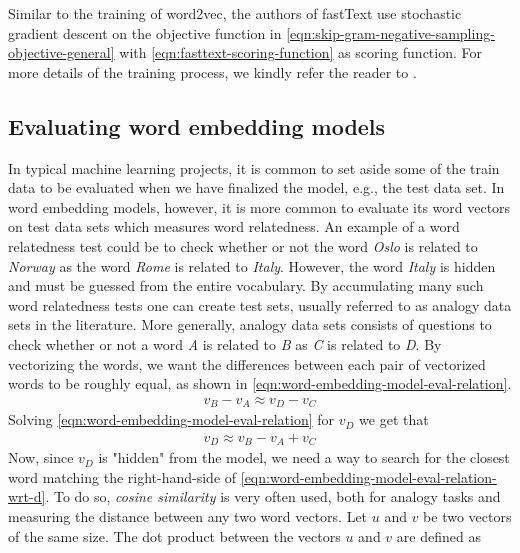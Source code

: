 Similar to the training of word2vec, the authors of fastText use stochastic gradient descent on the objective function in \cref{eqn:skip-gram-negative-sampling-objective-general} with \cref{eqn:fasttext-scoring-function} as scoring function. For more details of the training process, we kindly refer the reader to \cite[4 Experimental setup]{bojanowski2017enriching}.

\subsection{Evaluating word embedding models}
\label{sec:eval-word2vec-model}
In typical machine learning projects, it is common to set aside some of the train data to be evaluated when we have finalized the model, e.g., the test data set. In word embedding models, however, it is more common to evaluate its word vectors on test data sets which measures word relatedness. An example of a word relatedness test could be to check whether or not the word \textit{Oslo} is related to \textit{Norway} as the word \textit{Rome} is related to \textit{Italy}. However, the word \textit{Italy} is hidden and must be guessed from the entire vocabulary. By accumulating many such word relatedness tests one can create test sets, usually referred to as analogy data sets in the literature. More generally, analogy data sets consists of questions to check whether or not a word \textit{A} is related to \textit{B} as \textit{C} is related to \textit{D}. By vectorizing the words, we want the differences between each pair of vectorized words to be roughly equal, as shown in \cref{eqn:word-embedding-model-eval-relation}.
\begin{align}
    v_{\textit{B}} - v_{\textit{A}} \approx v_{\textit{D}} - v_{\textit{C}}
    \label{eqn:word-embedding-model-eval-relation}
\end{align}
Solving \cref{eqn:word-embedding-model-eval-relation} for $v_{\textit{D}}$ we get that
\begin{align}
    v_{\textit{D}} \approx v_{\textit{B}} - v_{\textit{A}} + v_{\textit{C}}
    \label{eqn:word-embedding-model-eval-relation-wrt-d}
\end{align}
Now, since $v_{\textit{D}}$ is "hidden" from the model, we need a way to search for the closest word matching the right-hand-side of \cref{eqn:word-embedding-model-eval-relation-wrt-d}. To do so, \textit{cosine similarity} is very often used, both for analogy tasks and measuring the distance between any two word vectors. Let $u$ and $v$ be two vectors of the same size. The dot product between the vectors $u$ and $v$ are defined as
